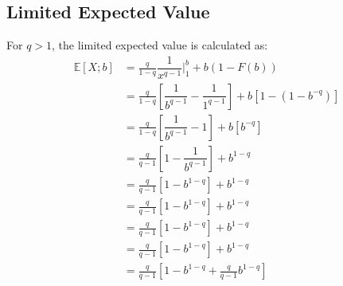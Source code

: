 \documentclass[]{article} %
\begin{document}
\subsection{Limited Expected Value}
For $q > 1$, the limited expected value is calculated as:
\begin{align}
	\mathbb{E}[X;b] 	&= \frac{q}{1-q} \dfrac{1}{x^{q-1}} \Big|_{1}^{b} + b  (1-F(b))\nonumber\\
 	&=  \frac{q}{1-q} \left[ \dfrac{1}{b^{q-1}} - \dfrac{1}{1^{q-1}}\right]+  b  \left[1-(1-b^{-q})\right]\nonumber\\
 	&=  \frac{q}{1-q} \left[ \dfrac{1}{b^{q-1}} - 1\right]+  b  \left[b^{-q}\right]\nonumber\\
 	&=  \frac{q}{q-1} \left[1 - \dfrac{1}{b^{q-1}}\right]+ b^{1-q}\nonumber\\
 	&=  \frac{q}{q-1} \left[1 - b^{1-q}\right]+b^{1-q}\nonumber\\
 	&=  \frac{q}{q-1} \left[1 - b^{1-q}\right]+ b^{1-q}\nonumber\\
 	&=  \frac{q}{q-1} \left[1 - b^{1-q}\right]+b^{1-q}\nonumber\\
 	&=  \frac{q}{q-1} \left[1 - b^{1-q}\right]+ b^{1-q}\\
 	&=	\frac{q}{q-1} \left[1 - b^{1-q} + \frac{q}{q-1} b^{1-q}\right]\nonumber\\
 \end{align}


\end{document}
